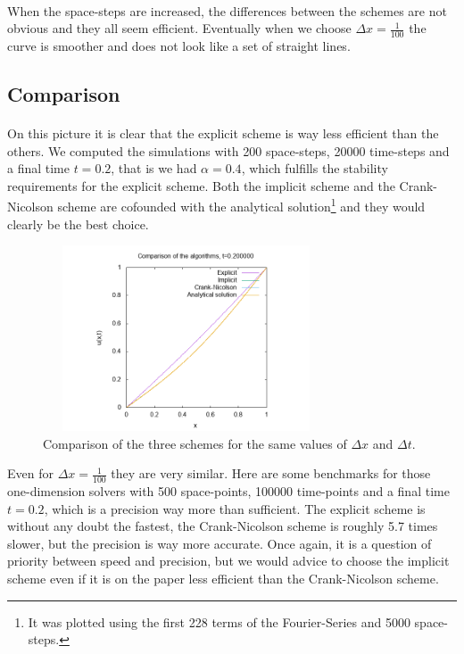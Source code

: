 \documentclass[a4paper, twoside, 11pt]{report}
\theoremstyle{theorem}
\theoremstyle{remark}
\theoremstyle{exemple}
\begin{document}
                \paragraph{}When the space-steps are increased, the differences between the schemes are not obvious and they all seem efficient. Eventually when we choose $\Delta x = \frac{1}{100}$ the curve is smoother and does not look like a set of straight lines.

            \subsection{Comparison}

                \paragraph{}On this picture it is clear that the explicit scheme is way less efficient than the others. We computed the simulations with 200 space-steps, 20000 time-steps and a final time $t=0.2$, that is we had $\alpha = 0.4$, which fulfills the stability requirements for the explicit scheme. Both the implicit scheme and the Crank-Nicolson scheme are cofounded with the analytical solution\footnote{It was plotted using the first 228 terms of the Fourier-Series and 5000 space-steps.} and they would clearly be the best choice.

                \begin{figure}[h!]
                    \begin{center}
                        \includegraphics[width=8.5cm,height=5.5cm]{images/comparison.png}
                        \caption{Comparison of the three schemes for the same values of $\Delta x$ and $\Delta t$.}
                    \end{center}
                \end{figure}

                Even for $\Delta x = \frac{1}{100}$ they are very similar. Here are some benchmarks for those one-dimension solvers with 500 space-points, 100000 time-points and a final time $t=0.2$, which is a precision way more than sufficient. The explicit scheme is without any doubt the fastest, the Crank-Nicolson scheme is roughly 5.7 times slower, but the precision is way more accurate. Once again, it is a question of priority between speed and precision, but we would advice to choose the implicit scheme even if it is on the paper less efficient than the Crank-Nicolson scheme.
\end{document}
